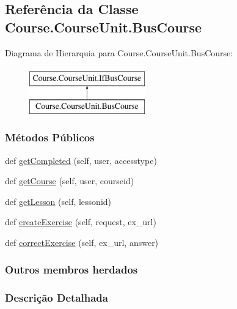\hypertarget{classCourse_1_1CourseUnit_1_1BusCourse}{}\subsection{Referência da Classe Course.\+Course\+Unit.\+Bus\+Course}
\label{classCourse_1_1CourseUnit_1_1BusCourse}
Diagrama de Hierarquia para Course.\+Course\+Unit.\+Bus\+Course\+:\begin{figure}[H]
\begin{center}
\leavevmode
\includegraphics[height=2.000000cm]{d9/d88/classCourse_1_1CourseUnit_1_1BusCourse}
\end{center}
\end{figure}
\subsubsection*{Métodos Públicos}
\begin{DoxyCompactItemize}
\item 
def \hyperlink{classCourse_1_1CourseUnit_1_1BusCourse_a204497b0a06654e623c9c294f1ca5e66}{get\+Completed} (self, user, accesstype)
\item 
def \hyperlink{classCourse_1_1CourseUnit_1_1BusCourse_a924028d96b633d7810b60699af5502ee}{get\+Course} (self, user, courseid)
\item 
def \hyperlink{classCourse_1_1CourseUnit_1_1BusCourse_adc4fcfde76feb1d6da3cf6bee39583b1}{get\+Lesson} (self, lessonid)
\item 
def \hyperlink{classCourse_1_1CourseUnit_1_1BusCourse_a4b9b8ec5eb949d3a1b42aee125b1b90b}{create\+Exercise} (self, request, ex\+\_\+url)
\item 
def \hyperlink{classCourse_1_1CourseUnit_1_1BusCourse_a3414d888b6ce30bc9cfb3c2b2e78af65}{correct\+Exercise} (self, ex\+\_\+url, answer)
\end{DoxyCompactItemize}
\subsubsection*{Outros membros herdados}


\subsubsection{Descrição Detalhada}



